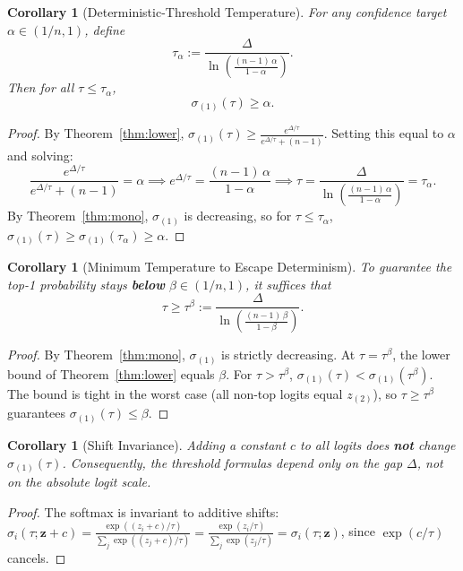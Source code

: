 \documentclass[11pt,a4paper]{article}
\newtheorem{corollary}[theorem]{Corollary}
\theoremstyle{definition}
\newcommand{\softmax}{\sigma}
\newcommand{\temp}{\tau}
\newcommand{\gap}{\Delta}
\begin{document}
\begin{corollary}[Deterministic-Threshold Temperature]
\label{cor:threshold}
For any confidence target $\alpha \in (1/n, 1)$, define
\[
  \temp_{\alpha} := \frac{\gap}{\ln\!\left(\frac{(n-1)\,\alpha}{1-\alpha}\right)}.
\]
Then for all $\temp \leq \temp_{\alpha}$,
\[
  \softmax_{(1)}(\temp) \geq \alpha.
\]
\end{corollary}

\begin{proof}
By Theorem~\ref{thm:lower}, $\softmax_{(1)}(\temp) \geq \frac{e^{\gap/\temp}}{e^{\gap/\temp} + (n-1)}$. Setting this equal to $\alpha$ and solving:
\[
  \frac{e^{\gap/\temp}}{e^{\gap/\temp} + (n-1)} = \alpha
  \implies e^{\gap/\temp} = \frac{(n-1)\,\alpha}{1-\alpha}
  \implies \temp = \frac{\gap}{\ln\!\left(\frac{(n-1)\,\alpha}{1-\alpha}\right)} = \temp_\alpha.
\]
By Theorem~\ref{thm:mono}, $\softmax_{(1)}$ is decreasing, so for $\temp \leq \temp_\alpha$, $\softmax_{(1)}(\temp) \geq \softmax_{(1)}(\temp_\alpha) \geq \alpha$.
\end{proof}

\begin{corollary}[Minimum Temperature to Escape Determinism]
\label{cor:escape}
To guarantee the top-1 probability stays \textbf{below} $\beta \in (1/n, 1)$, it suffices that
\[
  \temp \geq \temp^{\beta} := \frac{\gap}{\ln\!\left(\frac{(n-1)\,\beta}{1-\beta}\right)}.
\]
\end{corollary}

\begin{proof}
By Theorem~\ref{thm:mono}, $\softmax_{(1)}$ is strictly decreasing. At $\temp = \temp^\beta$, the lower bound of Theorem~\ref{thm:lower} equals $\beta$. For $\temp > \temp^\beta$, $\softmax_{(1)}(\temp) < \softmax_{(1)}(\temp^\beta)$. The bound is tight in the worst case (all non-top logits equal $z_{(2)}$), so $\temp \geq \temp^\beta$ guarantees $\softmax_{(1)}(\temp) \leq \beta$.
\end{proof}

\begin{corollary}[Shift Invariance]
\label{cor:shift}
Adding a constant $c$ to all logits does \textbf{not} change $\softmax_{(1)}(\temp)$. Consequently, the threshold formulas depend only on the gap $\gap$, not on the absolute logit scale.
\end{corollary}

\begin{proof}
The softmax is invariant to additive shifts: $\softmax_i(\temp; \mathbf{z} + c) = \frac{\exp((z_i+c)/\temp)}{\sum_j \exp((z_j+c)/\temp)} = \frac{\exp(z_i/\temp)}{\sum_j \exp(z_j/\temp)} = \softmax_i(\temp; \mathbf{z})$, since $\exp(c/\temp)$ cancels.
\end{proof}
\end{document}
